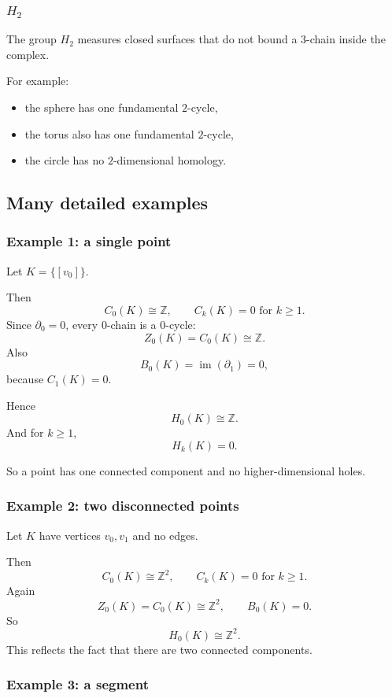 \documentclass[12pt,a4paper]{article}
\theoremstyle{notespace}
\begin{document}
\subsubsection{\texorpdfstring{$H_2$}{H2}}

The group \(H_2\) measures closed surfaces that do not bound a 3-chain inside the complex.

For example:
\begin{itemize}
	\item the sphere has one fundamental \(2\)-cycle,
	\item the torus also has one fundamental \(2\)-cycle,
	\item the circle has no \(2\)-dimensional homology.
\end{itemize}

\subsection{Many detailed examples}

\subsubsection{Example 1: a single point}

Let \(K=\{[v_0]\}\).

Then
\[
C_0(K)\cong \mathbb{Z},\qquad C_k(K)=0 \text{ for } k\ge 1.
\]
Since \(\partial_0=0\), every \(0\)-chain is a \(0\)-cycle:
\[
Z_0(K)=C_0(K)\cong \mathbb{Z}.
\]
Also
\[
B_0(K)=\operatorname{im}(\partial_1)=0,
\]
because \(C_1(K)=0\).

Hence
\[
H_0(K)\cong \mathbb{Z}.
\]
And for \(k\ge 1\),
\[
H_k(K)=0.
\]

So a point has one connected component and no higher-dimensional holes.

\subsubsection{Example 2: two disconnected points}

Let \(K\) have vertices \(v_0,v_1\) and no edges.

Then
\[
C_0(K)\cong \mathbb{Z}^2,\qquad C_k(K)=0 \text{ for } k\ge 1.
\]
Again
\[
Z_0(K)=C_0(K)\cong \mathbb{Z}^2,
\qquad
B_0(K)=0.
\]
So
\[
H_0(K)\cong \mathbb{Z}^2.
\]
This reflects the fact that there are two connected components.

\subsubsection{Example 3: a segment}
\end{document}
